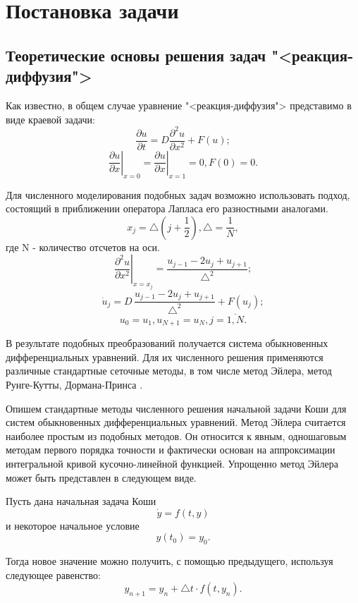 \documentclass[a4paper, 14pt]{extarticle}
\theoremstyle{definition}
\begin{document}
\section{Постановка задачи}

\subsection{Теоретические основы решения задач "<реакция-диффузия">}

\par Как известно, в общем случае уравнение "<реакция-диффузия"> представимо в виде краевой задачи:
$$\frac{\partial u}{\partial t} = D \frac{\partial^2 u}{\partial x^2} + F(u);$$
$$\left.{\frac{\partial u}{\partial x}} \right|_{x=0} = \left.{\frac{\partial u}{\partial x}} \right|_{x=1} = 0, F(0) = 0.$$

\par Для численного моделирования подобных задач возможно использовать подход, состоящий в приближении оператора Лапласа его разностными аналогами.
$$x_j = \bigtriangleup(j + \frac{1}{2}), \bigtriangleup = \frac{1}{N},$$
где N - количество отсчетов на оси.
$$\left.{\frac{\partial^2 u}{\partial x^2}}\right|_{x=x_j} = \frac{u_{j-1} - 2u_j + u_{j+1}}{\bigtriangleup^2};$$
$$\dot u_j = D\, \frac{u_{j-1} - 2u_j + u_{j+1}}{\bigtriangleup^2} + F(u_j);$$
$$u_0 = u_1, u_{N+1} = u_N, j = \overline{1, N}.$$

\par В результате подобных преобразований получается система обыкновенных дифференциальных уравнений. Для их численного решения применяются различные стандартные сеточные методы, в том числе метод Эйлера, метод Рунге-Кутты, Дормана-Принса \cite{Thomas}.

\par Опишем стандартные методы численного решения начальной задачи Коши для систем обыкновенных дифференциальных уравнений. Метод Эйлера считается наиболее простым из подобных методов. Он относится к явным, одношаговым методам первого порядка точности и фактически основан на аппроксимации интегральной кривой кусочно-линейной функцией. Упрощенно метод Эйлера может быть представлен в следующем виде.

\par Пусть дана начальная задача Коши
$$\dot y = f(t, y)$$
и некоторое начальное условие
$$y(t_0) = y_0.$$

\par Тогда новое значение можно получить, с помощью предыдущего, используя следующее равенство:
$$y_{n+1} = y_n + \bigtriangleup t \cdot f(t, y_n).$$
\end{document}
